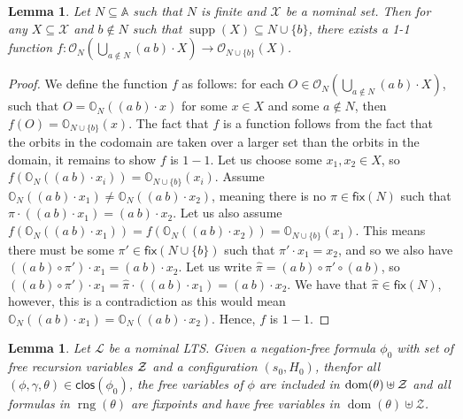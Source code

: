 \documentclass[10pt,a4paper]{article}
\newtheorem{lemma}[theorem]{Lemma}
\theoremstyle{definition}
\theoremstyle{remark}
\DeclareMathOperator{\dom}{dom}
\DeclareMathOperator{\rng}{rng}
\DeclareMathOperator{\supp}{supp}
\newcommand\Lcal{\mathcal{L}}
\newcommand\Xcal{\mathcal{X}}
\newcommand\Zcal{\mathcal{Z}}
\newcommand\Atoms{\mathbb{A}}
\newcommand\orb[1][]{\mathcal{O}_{#1}}
\newcommand\orbs[1][]{\mathbb{O}_{#1}}
\renewcommand\S{N}
\newcommand\fix{\mathsf{fix}}
\newcommand{\clos}[0]{\mathsf{clos}}
\begin{document}
\begin{lemma}\label{lem:unionOrb3} 
	Let $\S \subseteq \Atoms$ such that $\S$ is finite and $\Xcal$ be a nominal set.
	Then for any $X \subseteq \Xcal$ and $b \notin \S$ such that $\supp(X) \subseteq \S \cup \{b\}$, 
	there exists a 1-1 function 
	$f: \orb[\S](\bigcup_{a \notin \S} (a\ b)\cdot X) \rightarrow \orb[\S \cup \{b\}](X)$.
\end{lemma}
\begin{proof}
	We define the function $f$ as follows: for each $O \in \orb[\S](\bigcup_{a \notin \S} (a\ b)\cdot X)$, such that $O = \orbs[\S]((a\ b) \cdot x)$ for some $x \in X$ and some $a \notin \S$, then $f(O) = \orbs[\S \cup \{b\}](x)$.
	The fact that $f$ is a function follows from the fact that the orbits in the codomain are taken over a larger set than the orbits in the domain, it remains to show $f$ is $1-1$. 
	Let us choose some $x_1, x_2 \in X$, so $f(\orbs[\S]((a\ b) \cdot x_i)) = \orbs[\S \cup \{b\}](x_i)$. 
	Assume $\orbs[\S]((a\ b) \cdot x_1) \neq \orbs[\S]((a\ b)\cdot x_2)$, meaning there is no $\pi \in \fix(\S)$ such that $\pi \cdot ((a\ b)\cdot x_1) = (a\ b)\cdot x_2$.     
	Let us also assume $f(\orbs[\S]((a\ b)\cdot x_1)) = f(\orbs[\S]((a\ b)\cdot x_2)) = \orbs[\S \cup \{b\}](x_1)$. 
	This means there must be some $\pi' \in \fix(\S \cup \{b\})$ such that $\pi' \cdot x_1 = x_2$, and so we also have $((a\ b)\circ \pi') \cdot x_1 = (a\ b) \cdot x_2$.
	Let us write $\hat \pi = (a\ b)\circ \pi' \circ (a\ b)$, so $((a\ b)\circ \pi') \cdot x_1 = \hat \pi \cdot ((a\ b)\cdot x_1) = (a\ b)\cdot x_2$. We have that $\hat \pi \in \fix(\S)$, however, this is a contradiction as this would mean $\orbs[\S]((a\ b) \cdot x_1) = \orbs[\S]((a\ b)\cdot x_2)$. 
	Hence, $f$ is $1-1$.
\end{proof}

\begin{lemma}\label{lem:freshClosProps1}
		Let $\Lcal$ be a nominal LTS.
	Given a negation-free formula $\phi_0$ with set of free recursion variables $\cal Z$ and a configuration $(s_0,H_0)$, thenfor all $(\phi,\gamma,\theta)\in\clos(\phi_0)$, the free variables of $\phi$ are included in $\dom(\theta)\uplus \cal Z$ and all formulas in $\rng(\theta)$ are fixpoints and have free variables in $\dom(\theta)\uplus\Zcal$.
\end{lemma}
\end{document}
